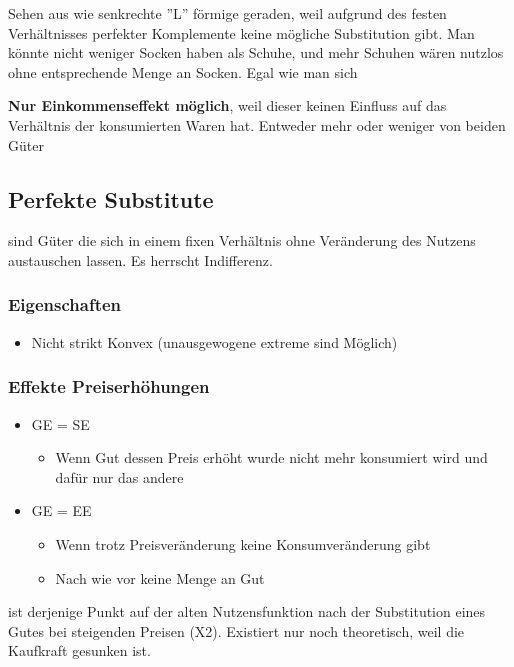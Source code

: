 Sehen aus wie senkrechte ''L'' förmige geraden, weil aufgrund des festen Verhältnisses perfekter Komplemente keine mögliche Substitution gibt. Man könnte nicht weniger Socken haben als Schuhe, und mehr Schuhen wären nutzlos ohne entsprechende Menge an Socken. Egal wie man sich 


\textbf{Nur Einkommenseffekt möglich}, weil dieser keinen Einfluss auf das Verhältnis der konsumierten Waren hat. Entweder mehr oder weniger von beiden Güter

\subsection{Perfekte Substitute}

\begin{definition}
     sind Güter die sich in einem fixen Verhältnis ohne Veränderung des Nutzens austauschen lassen. Es herrscht Indifferenz. 
\end{definition}

\subsubsection{Eigenschaften}
\begin{itemize}
    \item Nicht strikt Konvex (unausgewogene extreme sind Möglich)
\end{itemize}

\subsubsection{Effekte Preiserhöhungen}
\begin{itemize}
    \item GE = SE
    \begin{itemize}
        \item Wenn Gut dessen Preis erhöht wurde nicht mehr konsumiert wird und dafür nur das andere
    \end{itemize}
    \item GE = EE
    \begin{itemize}
        \item Wenn trotz Preisveränderung keine Konsumveränderung gibt
        \item Nach wie vor keine Menge an Gut 
    \end{itemize}
\end{itemize}

\begin{definition}
     ist derjenige Punkt auf der alten Nutzensfunktion nach der Substitution eines Gutes bei steigenden Preisen (X2). Existiert nur noch theoretisch, weil die Kaufkraft gesunken ist.
\end{definition}

